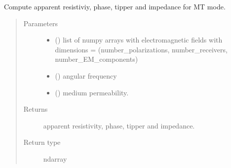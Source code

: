 \documentclass[letterpaper,10pt,english]{sphinxmanual}
\begin{document}
\begin{fulllineitems}
\label{\detokenize{petgem/postprocessing:petgem.postprocessing.computeImpedance}}
Compute apparent resistiviy, phase, tipper and impedance for MT mode.
\begin{quote}\begin{description}
\item[{Parameters}] \leavevmode\begin{itemize}
\item {} 
 () \textendash{} list of numpy arrays with electromagnetic fields with dimensions = (number\_polarizations, number\_receivers, number\_EM\_components)

\item {} 
 () \textendash{} angular frequency

\item {} 
 () \textendash{} medium permeability.

\end{itemize}

\item[{Returns}] \leavevmode
apparent resistivity, phase, tipper and impedance.

\item[{Return type}] \leavevmode
ndarray

\end{description}\end{quote}

\end{fulllineitems}

\end{document}
